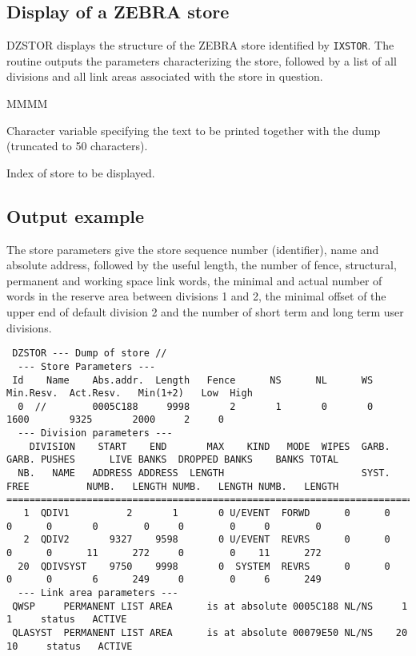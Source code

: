 \subsection{Display of a ZEBRA store}
\par DZSTOR displays the structure of the ZEBRA store identified by
{\tt IXSTOR}.
The routine outputs the parameters
characterizing the store, followed by a
list of all divisions and all link areas associated with the store in
question.
\Idesc
\begin{DL}{MMMM}
\item[CHTEXT]Character variable specifying the text to be printed
together with the dump (truncated to 50 characters).
\item[IXSTOR]Index of store to be displayed.
\end{DL}
\subsection{Output example}
\par The store parameters give the store sequence number (identifier),
name and
absolute address, followed by the useful length, the number of fence,
structural, permanent and working space link words, the minimal and
actual number of words in the reserve area between divisions 1 and 2,
the minimal offset of the upper end of default division 2 and the
number of short term and long term user divisions.
\begin{Listing}\begin{verbatim}
 DZSTOR --- Dump of store //
  --- Store Parameters ---
 Id    Name    Abs.addr.  Length   Fence      NS      NL      WS  Min.Resv.  Act.Resv.   Min(1+2)   Low  High
  0  //        0005C188     9998       2       1       0       0       1600       9325       2000     2     0
  --- Division parameters ---
    DIVISION    START    END       MAX    KIND   MODE  WIPES  GARB.  GARB. PUSHES      LIVE BANKS  DROPPED BANKS    BANKS TOTAL
  NB.   NAME   ADDRESS ADDRESS  LENGTH                        SYST.   FREE          NUMB.   LENGTH NUMB.   LENGTH NUMB.   LENGTH
==================================================================================================================================
   1  QDIV1          2       1       0 U/EVENT  FORWD      0      0      0      0       0        0     0        0     0        0
   2  QDIV2       9327    9598       0 U/EVENT  REVRS      0      0      0      0      11      272     0        0    11      272
  20  QDIVSYST    9750    9998       0  SYSTEM  REVRS      0      0      0      0       6      249     0        0     6      249
  --- Link area parameters ---
 QWSP     PERMANENT LIST AREA      is at absolute 0005C188 NL/NS     1    1     status   ACTIVE
 QLASYST  PERMANENT LIST AREA      is at absolute 00079E50 NL/NS    20   10     status   ACTIVE
\end{verbatim}\end{Listing}
